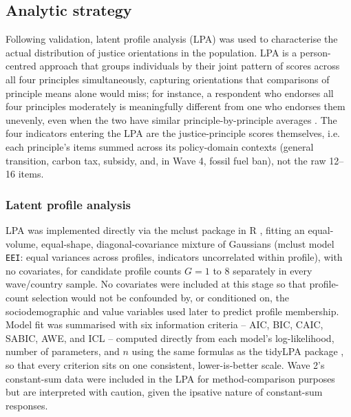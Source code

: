\documentclass[10pt,letterpaper]{article}
\begin{document}

\subsection*{Analytic strategy}

Following validation, latent profile analysis (LPA) was used to characterise the actual distribution of justice orientations in the population.
LPA is a person-centred approach that groups individuals by their joint pattern of scores across all four principles simultaneously, capturing orientations that comparisons of principle means alone would miss; for instance, a respondent who endorses all four principles moderately is meaningfully different from one who endorses them unevenly, even when the two have similar principle-by-principle averages \autocite{spurk2020,weller2020}.
The four indicators entering the LPA are the justice-principle scores themselves, i.e. each principle's items summed across its policy-domain contexts (general transition, carbon tax, subsidy, and, in Wave 4, fossil fuel ban), not the raw 12--16 items.

\subsubsection*{Latent profile analysis}
LPA was implemented directly via the {mclust} package in R \autocite{scrucca2023}, fitting an equal-volume, equal-shape, diagonal-covariance mixture of Gaussians (mclust model \texttt{EEI}: equal variances across profiles, indicators uncorrelated within profile), with no covariates, for candidate profile counts $G = 1$ to $8$ separately in every wave/country sample. No covariates were included at this stage so that profile-count selection would not be confounded by, or conditioned on, the sociodemographic and value variables used later to predict profile membership.
Model fit was summarised with six information criteria -- AIC, BIC, CAIC, SABIC, AWE, and ICL -- computed directly from each model's log-likelihood, number of parameters, and $n$ using the same formulas as the {tidyLPA} package \autocite{rosenberg2018}, so that every criterion sits on one consistent, lower-is-better scale.
Wave 2's constant-sum data were included in the LPA for method-comparison purposes but are interpreted with caution, given the ipsative nature of constant-sum responses.
\end{document}
